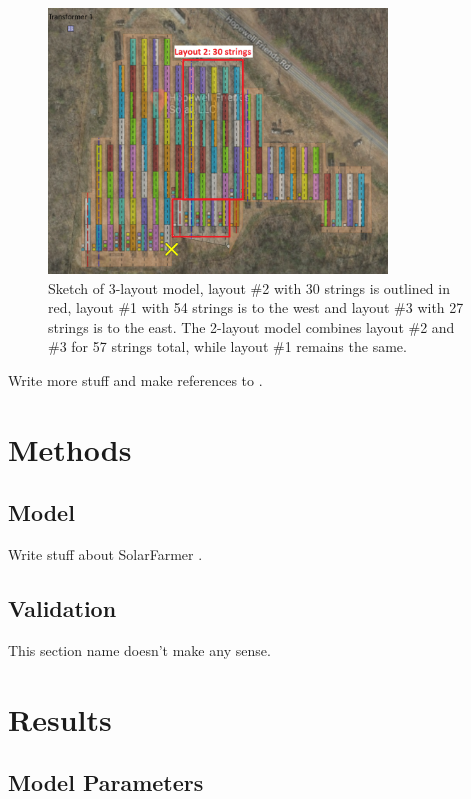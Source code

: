\documentclass[conference]{IEEEtran}
\begin{document}
\begin{figure}[htbp]
\centerline{\includegraphics[width=9cm]{layouts.png}}
\caption{Sketch of 3-layout model, layout \#2 with 30 strings is outlined in red, layout \#1 with 54 strings is to the west and layout \#3 with 27 strings is to the east. The 2-layout model combines layout \#2 and \#3 for 57 strings total, while layout \#1 remains the same.}
\label{fig:layouts}
\end{figure}


Write more stuff and make references to \cite{Marion2013}.

\section{Methods}

\subsection{Model}

Write stuff about SolarFarmer \cite{Mikofski_8547323}.


\subsection{Validation}
This section name doesn't make any sense.

\section{Results}

\subsection{Model Parameters}
\end{document}
